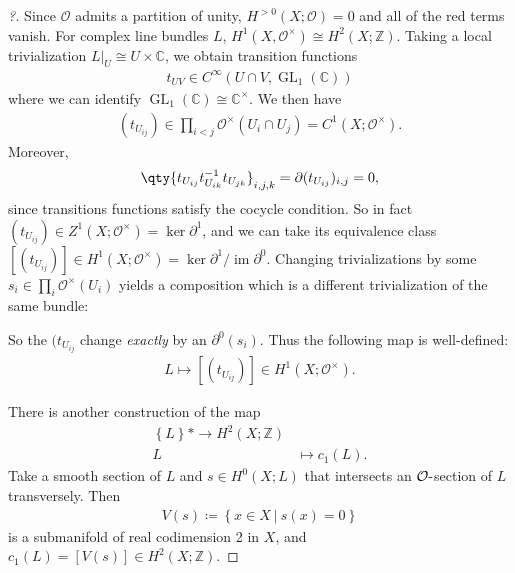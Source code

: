 \begin{proof}[?]
Since \({\mathcal{O}}\) admits a partition of unity,
\(H^{>0}(X; {\mathcal{O}}) = 0\) and all of the red terms vanish. For
complex line bundles \(L\),
\(H^1(X, {\mathcal{O}}^{\times}) \cong H^2(X; {\mathbb{Z}})\). Taking a
local trivialization
\({ \left.{{L}} \right|_{{U}} } \cong U \times{\mathbb{C}}\), we obtain
transition functions
\begin{align*}
t_{UV} \in C^{\infty }(U \cap V, \operatorname{GL}_1({\mathbb{C}}) )
\end{align*}
where we can identify
\(\operatorname{GL}_1({\mathbb{C}}) \cong {\mathbb{C}}^{\times}\). We
then have
\begin{align*}
(t_{U_{ij}}) \in \prod_{i < j} {\mathcal{O}}^{\times}(U_i \cap U_j) = C^1(X; {\mathcal{O}}^{\times})
.\end{align*}
Moreover,
\begin{align*}
\qty{ 
t_{U_{ij}}
t_{U_{ik}} ^{-1}
t_{U_{jk}}
}_{i,j,k} 
= {{\partial}}( t_{U_{ij} } ) _{i, j} = 0
,\end{align*}
since transitions functions satisfy the cocycle condition. So in fact
\((t_{U_{ij}}) \in Z^1(X; {\mathcal{O}}^{\times}) = \ker {{\partial}}^1\),
and we can take its equivalence class
\([ ( t_{U_{ij} } ) ] \in H^1(X; {\mathcal{O}}^{\times}) = \ker {{\partial}}^1 / \operatorname{im}{{\partial}}^0\).
Changing trivializations by some
\(s_i \in \prod_i {\mathcal{O}}^{\times}(U_i)\) yields a composition
which is a different trivialization of the same bundle:

\begin{center}
\end{center}

So the \((t_{ U_{ij}}\) change \emph{exactly} by an
\({{\partial}}^0( s_i)\). Thus the following map is well-defined:
\begin{align*}
L \mapsto [ (t_{U_{ij}} ) ] \in H^1(X; {\mathcal{O}}^{\times})
.\end{align*}

There is another construction of the map
\begin{align*}
\left\{{L}\right\} *\to H^2(X; {\mathbb{Z}}) \\
L &\mapsto c_1(L)
.\end{align*}
Take a smooth section of \(L\) and \(s\in H^0(X; L)\) that intersects an
\({\mathcal{O}}{\hbox{-}}\)section of \(L\) transversely. Then
\begin{align*}
V(s) \coloneqq\left\{{ x\in X {~\mathrel{\Big|}~}s(x) = 0 }\right\}
\end{align*}
is a submanifold of real codimension 2 in \(X\), and
\(c_1(L) = [ V(s) ] \in H^2(X; {\mathbb{Z}})\).

\end{proof}


